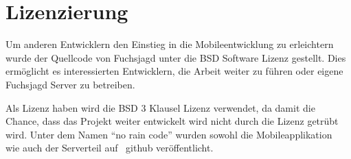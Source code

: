
\newpage
\section{Lizenzierung} %
\label{sec:Lizenzierung}
Um anderen Entwicklern den Einstieg in die Mobileentwicklung zu erleichtern wurde der Quellcode von Fuchsjagd unter die BSD Software Lizenz gestellt. Dies ermöglicht es interessierten Entwicklern, die Arbeit weiter zu führen oder eigene Fuchsjagd Server zu betreiben.

Als Lizenz haben wird die BSD 3 Klausel Lizenz verwendet, da damit die Chance, dass das Projekt weiter entwickelt wird nicht durch die Lizenz getrübt wird. Unter dem Namen "`no rain code"' wurden sowohl die Mobileapplikation~\cite{bib:sourcemobile} wie auch der Serverteil auf~\cite{bib:sourceserver } github veröffentlicht.
